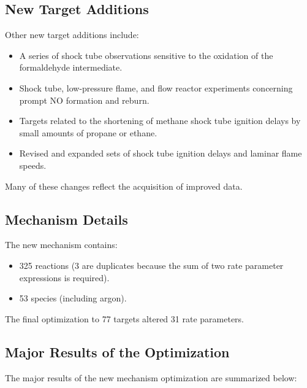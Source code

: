 \subsection*{New Target Additions}
Other new target additions include:
\begin{itemize}
    \item A series of shock tube observations sensitive to the oxidation of the formaldehyde intermediate.
    \item Shock tube, low-pressure flame, and flow reactor experiments concerning prompt NO formation and reburn.
    \item Targets related to the shortening of methane shock tube ignition delays by small amounts of propane or ethane.
    \item Revised and expanded sets of shock tube ignition delays and laminar flame speeds.
\end{itemize}

Many of these changes reflect the acquisition of improved data.

\subsection*{Mechanism Details}
The new mechanism contains:
\begin{itemize}
    \item 325 reactions (3 are duplicates because the sum of two rate parameter expressions is required).
    \item 53 species (including argon).
\end{itemize}

The final optimization to 77 targets altered 31 rate parameters.

\subsection*{Major Results of the Optimization}
The major results of the new mechanism optimization are summarized below:

